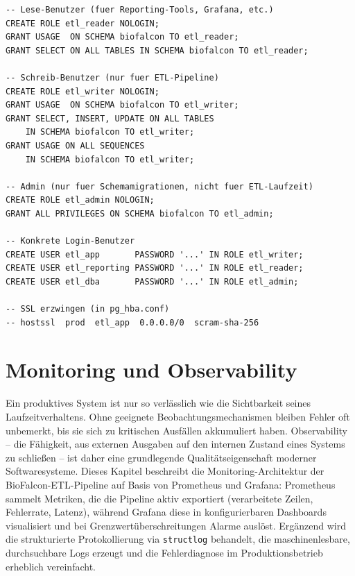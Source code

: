 \documentclass[12pt,a4paper]{report}
\theoremstyle{definition}
\theoremstyle{remark}
\newcommand{\code}[1]{\texttt{#1}}
\begin{document}
\begin{lstlisting}[style=sql, caption={SQL: Benutzerverwaltung nach Least-Privilege-Prinzip}]
-- Lese-Benutzer (fuer Reporting-Tools, Grafana, etc.)
CREATE ROLE etl_reader NOLOGIN;
GRANT USAGE  ON SCHEMA biofalcon TO etl_reader;
GRANT SELECT ON ALL TABLES IN SCHEMA biofalcon TO etl_reader;

-- Schreib-Benutzer (nur fuer ETL-Pipeline)
CREATE ROLE etl_writer NOLOGIN;
GRANT USAGE  ON SCHEMA biofalcon TO etl_writer;
GRANT SELECT, INSERT, UPDATE ON ALL TABLES
    IN SCHEMA biofalcon TO etl_writer;
GRANT USAGE ON ALL SEQUENCES
    IN SCHEMA biofalcon TO etl_writer;

-- Admin (nur fuer Schemamigrationen, nicht fuer ETL-Laufzeit)
CREATE ROLE etl_admin NOLOGIN;
GRANT ALL PRIVILEGES ON SCHEMA biofalcon TO etl_admin;

-- Konkrete Login-Benutzer
CREATE USER etl_app       PASSWORD '...' IN ROLE etl_writer;
CREATE USER etl_reporting PASSWORD '...' IN ROLE etl_reader;
CREATE USER etl_dba       PASSWORD '...' IN ROLE etl_admin;

-- SSL erzwingen (in pg_hba.conf)
-- hostssl  prod  etl_app  0.0.0.0/0  scram-sha-256
\end{lstlisting}

\chapter{Monitoring und Observability}
\label{sec:monitoring}

Ein produktives System ist nur so verlässlich wie die Sichtbarkeit seines Laufzeitverhaltens. Ohne geeignete Beobachtungsmechanismen bleiben Fehler oft unbemerkt, bis sie sich zu kritischen Ausfällen akkumuliert haben. Observability -- die Fähigkeit, aus externen Ausgaben auf den internen Zustand eines Systems zu schließen -- ist daher eine grundlegende Qualitätseigenschaft moderner Softwaresysteme. Dieses Kapitel beschreibt die Monitoring-Architektur der BioFalcon-ETL-Pipeline auf Basis von Prometheus und Grafana: Prometheus sammelt Metriken, die die Pipeline aktiv exportiert (verarbeitete Zeilen, Fehlerrate, Latenz), während Grafana diese in konfigurierbaren Dashboards visualisiert und bei Grenzwertüberschreitungen Alarme auslöst. Ergänzend wird die strukturierte Protokollierung via \code{structlog} behandelt, die maschinenlesbare, durchsuchbare Logs erzeugt und die Fehlerdiagnose im Produktionsbetrieb erheblich vereinfacht.
\end{document}
